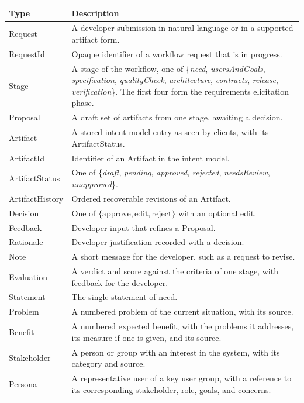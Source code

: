 \documentclass[12pt, titlepage]{article}
\begin{document}
{\renewcommand{\arraystretch}{1.2}
\begin{longtable}{l p{10.5cm}}
\toprule
\textbf{Type} & \textbf{Description}\\
\midrule
\endhead
Request & A developer submission in natural language or in a supported artifact
form.\\
RequestId & Opaque identifier of a workflow request that is in progress.\\
Stage & A stage of the workflow, one of \{\textit{need}, \textit{usersAndGoals},
\textit{specification}, \textit{qualityCheck}, \textit{architecture},
\textit{contracts}, \textit{release}, \textit{verification}\}. The first four
form the requirements elicitation phase.\\
Proposal & A draft set of artifacts from one stage, awaiting a decision.\\
Artifact & A stored intent model entry as seen by clients, with its ArtifactStatus.\\
ArtifactId & Identifier of an Artifact in the intent model.\\
ArtifactStatus & One of \{\textit{draft}, \textit{pending}, \textit{approved},
\textit{rejected}, \textit{needsReview}, \textit{unapproved}\}.\\
ArtifactHistory & Ordered recoverable revisions of an Artifact.\\
Decision & One of $\{\mathrm{approve}, \mathrm{edit}, \mathrm{reject}\}$ with an
optional edit.\\
Feedback & Developer input that refines a Proposal.\\
Rationale & Developer justification recorded with a decision.\\
Note & A short message for the developer, such as a request to revise.\\
Evaluation & A verdict and score against the criteria of one stage, with
feedback for the developer.\\
Statement & The single statement of need.\\
Problem & A numbered problem of the current situation, with its source.\\
Benefit & A numbered expected benefit, with the problems it addresses, its
measure if one is given, and its source.\\
Stakeholder & A person or group with an interest in the system, with its
category and source.\\
Persona & A representative user of a key user group, with a reference to its
corresponding stakeholder, role, goals, and concerns.\\

\end{longtable}}
\end{document}

